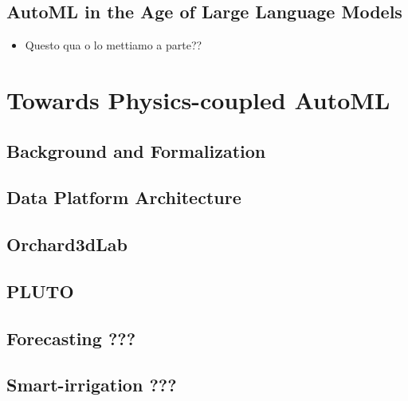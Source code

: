\documentclass[a4paper,12pt,times,numbered,print,index]{Classes/PhDThesisPSnPDF}
\begin{document}
\chapter{AutoML in the Age of Large Language Models}
\label{automl-chap:llm}
\begin{itemize}
    \item Questo qua o lo mettiamo a parte??
\end{itemize}

\part{Towards Physics-coupled AutoML}\label{part:farming}

\chapter{Background and Formalization}
\label{precision-chap:background}

\chapter{Data Platform Architecture}
\label{precision-chap:architecture}

\chapter{Orchard3dLab}
\label{precision-chap:orchard}

\chapter{PLUTO}
\label{precision-chap:pluto}

\chapter{Forecasting ???}
\label{precision-chap:forecasting}

\chapter{Smart-irrigation ???}
\label{precision-chap:smart-irrigation}
\end{document}
